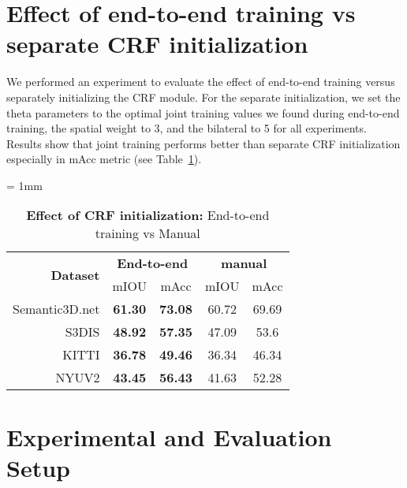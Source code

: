 \documentclass[10pt,twocolumn,letterpaper]{article}
\begin{document}
 \section{Effect of end-to-end training vs separate CRF initialization} \label{sec:crf_init}
We performed an experiment to evaluate the effect of end-to-end training versus separately initializing the CRF module. For the separate initialization, we set the theta parameters to the optimal joint training values we found during end-to-end training, the spatial weight to 3, and the bilateral to 5 for all experiments. Results show that joint training performs better than separate CRF initialization especially in mAcc metric (see Table~\ref{tab:manualCRF}).
{\small
\tabcolsep= 1mm
\begin{table}[ht]
    \centering
    \caption{\small{\textbf{Effect of CRF initialization:} End-to-end training vs Manual}}
    \begin{tabular}{r|cc|cc}
        \multirow{2}{*}{\small{\textbf{Dataset}}} & \multicolumn{2}{|c}{\small{\textbf{End-to-end}}} & \multicolumn{2}{|c}{\small{\textbf{manual}}} \\
         & mIOU & mAcc & mIOU & mAcc \\ \hline
        Semantic3D.net & \textbf{61.30} & \textbf{73.08} & 60.72 & 69.69 \\
        S3DIS & \textbf{48.92} & \textbf{57.35} & 47.09 & 53.6\\
        KITTI & \textbf{36.78} & \textbf{49.46} & 36.34 & 46.34 \\
        NYUV2 & \textbf{43.45} & \textbf{56.43} & 41.63 & 52.28\\
    \end{tabular}
    \label{tab:manualCRF}
\end{table}} 

\vspace{5mm}
\section{Experimental and Evaluation Setup}\label{sec:setup}
\end{document}
